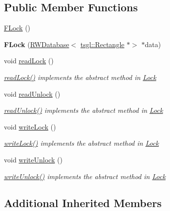 \subsection*{Public Member Functions}
\begin{DoxyCompactItemize}
\item 
\hyperlink{class_f_lock_a7fbb4dfce8ff879b88ff77efd4b76a96}{F\+Lock} ()
\item 
\mbox{\label{class_f_lock_a430e0591ef1927b64124cd11085c021b}} 
{\bfseries F\+Lock} (\hyperlink{class_r_w_database}{R\+W\+Database}$<$ \hyperlink{classtsgl_1_1_rectangle}{tsgl\+::\+Rectangle} $\ast$$>$ $\ast$data)
\item 
void \hyperlink{class_f_lock_a8b1cde1cfe107eeb20d5f250a1c310e6}{read\+Lock} ()
\begin{DoxyCompactList}\small\item\em \hyperlink{class_f_lock_a8b1cde1cfe107eeb20d5f250a1c310e6}{read\+Lock()} implements the abstract method in \hyperlink{class_lock}{Lock} \end{DoxyCompactList}\item 
void \hyperlink{class_f_lock_ab643a836b8844cc9be52dcaf7ab18df1}{read\+Unlock} ()
\begin{DoxyCompactList}\small\item\em \hyperlink{class_f_lock_ab643a836b8844cc9be52dcaf7ab18df1}{read\+Unlock()} implements the abstract method in \hyperlink{class_lock}{Lock} \end{DoxyCompactList}\item 
void \hyperlink{class_f_lock_a4bd70bd74a3c6067f091d24a0b82edbe}{write\+Lock} ()
\begin{DoxyCompactList}\small\item\em \hyperlink{class_f_lock_a4bd70bd74a3c6067f091d24a0b82edbe}{write\+Lock()} implements the abstract method in \hyperlink{class_lock}{Lock} \end{DoxyCompactList}\item 
void \hyperlink{class_f_lock_afb22121c126a71c24e751ae7315e9a48}{write\+Unlock} ()
\begin{DoxyCompactList}\small\item\em \hyperlink{class_f_lock_afb22121c126a71c24e751ae7315e9a48}{write\+Unlock()} implements the abstract method in \hyperlink{class_lock}{Lock} \end{DoxyCompactList}\end{DoxyCompactItemize}
\subsection*{Additional Inherited Members}


